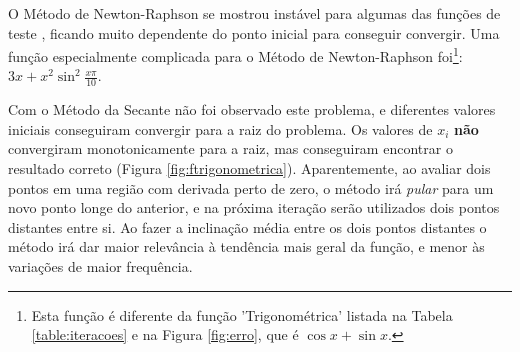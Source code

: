\documentclass[final,5p]{elsarticle}
\numberwithin{equation}{section}
\begin{document}
    \begin{figure*} 
        \caption{Evolução do erro do Método da Secante com diferentes funções (linhas tracejadas representam $\varepsilon_{i+1} / \varepsilon_i = 0.5$ e $\varepsilon_{i+1} / \varepsilon_i^2 = 0.5$).}
        \label{fig:erro}
    \end{figure*}
    
    O Método de Newton-Raphson se mostrou instável para algumas das funções de teste \cite{relatorionewtonraphson}, ficando muito dependente do ponto inicial para conseguir convergir. Uma função especialmente complicada para o Método de Newton-Raphson foi\footnote{Esta função é diferente da função 'Trigonométrica' listada na Tabela \ref{table:iteracoes} e na Figura \ref{fig:erro}, que é $\cos x + \sin x$.}: $3x + x^2 \sin^2 \frac{x\pi}{10}$. 
    
    Com o Método da Secante não foi observado este problema, e diferentes valores iniciais conseguiram convergir para a raiz do problema. Os valores de $x_i$ \textbf{não} convergiram monotonicamente para a raiz, mas conseguiram encontrar o resultado correto (Figura \ref{fig:ftrigonometrica}). Aparentemente, ao avaliar dois pontos em uma região com derivada perto de zero, o método irá \emph{pular} para um novo ponto longe do anterior, e na próxima iteração serão utilizados dois pontos distantes entre si. Ao fazer a inclinação média entre os dois pontos distantes o método irá dar maior relevância à tendência mais geral da função, e menor às variações de maior frequência. 
\end{document}
